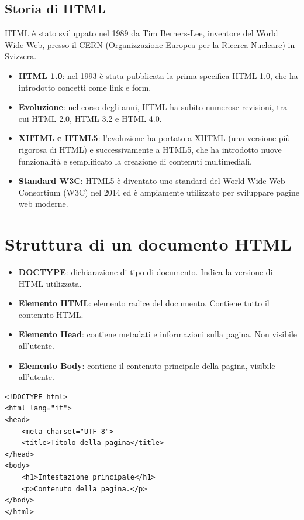 \subsection{Storia di HTML}

HTML è stato sviluppato nel 1989 da Tim Berners-Lee, inventore del World Wide Web, presso il CERN (Organizzazione Europea per la Ricerca Nucleare) in Svizzera.

\begin{itemize}
    \item \textbf{HTML 1.0}: nel 1993 è stata pubblicata la prima specifica HTML 1.0, che ha introdotto concetti come link e form.
    \item \textbf{Evoluzione}: nel corso degli anni, HTML ha subito numerose revisioni, tra cui HTML 2.0, HTML 3.2 e HTML 4.0.
    \item \textbf{XHTML e HTML5}: l'evoluzione ha portato a XHTML (una versione più rigorosa di HTML) e successivamente a HTML5, che ha introdotto nuove funzionalità e semplificato la creazione di contenuti multimediali.
    \item \textbf{Standard W3C}: HTML5 è diventato uno standard del World Wide Web Consortium (W3C) nel 2014 ed è ampiamente utilizzato per sviluppare pagine web moderne.
\end{itemize}

\section{Struttura di un documento HTML}

\begin{itemize}
    \item \textbf{DOCTYPE}: dichiarazione di tipo di documento. Indica la versione di HTML utilizzata.
    \item \textbf{Elemento HTML}: elemento radice del documento. Contiene tutto il contenuto HTML.
    \item \textbf{Elemento Head}: contiene metadati e informazioni sulla pagina. Non visibile all'utente.
    \item \textbf{Elemento Body}: contiene il contenuto principale della pagina, visibile all'utente.
\end{itemize}

\begin{lstlisting}[language=HTML5, caption=Struttura di base di un documento HTML]
<!DOCTYPE html>
<html lang="it">
<head>
    <meta charset="UTF-8">
    <title>Titolo della pagina</title>
</head>
<body>
    <h1>Intestazione principale</h1>
    <p>Contenuto della pagina.</p>
</body>
</html>
\end{lstlisting}

